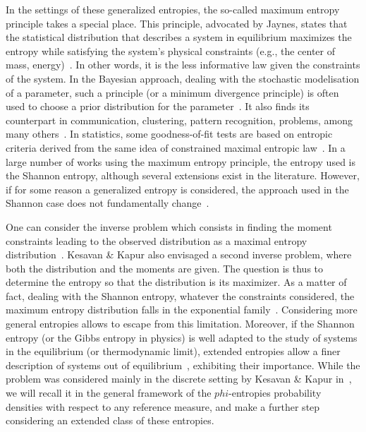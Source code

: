 \documentclass[entropy,article,submit,moreauthors,pdftex]{Definitions/mdpi}
\newcommand{\SZ}[1]{{\color{blue} #1}}                                       %
\begin{document}
In the  settings of these  generalized entropies, the so-called  maximum entropy
principle takes  a special place.   This principle, advocated by  Jaynes, states
that  the  statistical  distribution  that describes  a  system  in  equilibrium
maximizes the entropy while satisfying  the system's physical constraints (e.g.,
the  center of  mass, energy)~\cite{Jay57,  Kap89, Arn01,  CovTho06, Gok75}.  In
other  words, it  is  the less  informative  law given  the  constraints of  the
system. In the Bayesian approach, dealing  with the stochastic modelisation of a
parameter, such a principle (or a minimum divergence principle) is often used to
choose  a  prior  distribution  for  the  parameter~\cite{Jay68,  Csi91,  Bas13,
  FriSri08, Rob07}. It also finds  its counterpart in communication, clustering,
pattern recognition,  problems, among many others~\cite{Kap89,  Jay82, JonByr90,
  Arn01,  HerMa02, ParBer09}.   In  statistics, some  goodness-of-fit tests  are
based on  entropic criteria derived  from the  same idea of  constrained maximal
entropic  law~\cite{Vas76, Gok83,  Son02, Leq14,  Leq15, GirReg15}.  In a  large
number of  works using the  maximum entropy principle,  the entropy used  is the
Shannon entropy, although several extensions  exist in the literature.  However,
if for some reason a generalized entropy is considered, the approach used in the
Shannon   case  does   not  fundamentally   change~\cite{KesKap89,  BorLew91:03,
  BorLew91:05, BorLew93}.

One  can consider  the  inverse problem  which consists  in  finding the  moment
constraints  leading  to   the  observed  distribution  as   a  maximal  entropy
distribution~\cite{KesKap89}.  Kesavan \& Kapur  also envisaged a second inverse
problem, where both the distribution and the moments are given.  The question is
thus to determine  the entropy so that  the distribution is its  maximizer. As a
matter  of fact,  dealing with  the  Shannon entropy,  whatever the  constraints
considered,  the   maximum  entropy   distribution  falls  in   the  exponential
family~\cite{CovTho06, BorLew91:05, Arn01,  MezMon09}.  Considering more general
entropies  allows to  escape from  this  limitation.  Moreover,  if the  Shannon
entropy  (or the  Gibbs entropy  in physics)  is well  adapted to  the study  of
systems in the equilibrium (or  thermodynamic limit), extended entropies allow a
finer description  of systems  out of equilibrium~\cite{Tsa88,  TsaMen98, Tsa99,
  Tsa09, EssSch00,  ParBir05}, exhibiting  their importance.  While  the problem
was   considered  mainly   in  the   discrete  setting   by  Kesavan   \&  Kapur
in~\cite{KesKap89},  \SZ{we will  recall  it  in the  general  framework of  the
  $phi$-entropies probability densities with  respect to any reference measure,}
and make a further step considering an extended class of these entropies.
\end{document}
